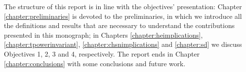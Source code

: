 The structure of this report is in line with the objectives' presentation: Chapter \ref{chapter:preliminaries} is devoted to the preliminaries, in which we introduce all the definitions and results that are necessary to understand the contributions presented in this monograph; in Chapters \ref{chapter:heimplications}, \ref{chapter:tpowerinvariant}, \ref{chapter:chsnimplications} and \ref{chapter:sd} we discuss Objectives 1, 2, 3 and 4, respectively. The report ends in Chapter \ref{chapter:conclusions} with some conclusions and future work.

